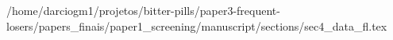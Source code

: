 /home/darciogm1/projetos/bitter-pills/paper3-frequent-losers/papers_finais/paper1_screening/manuscript/sections/sec4_data_fl.tex